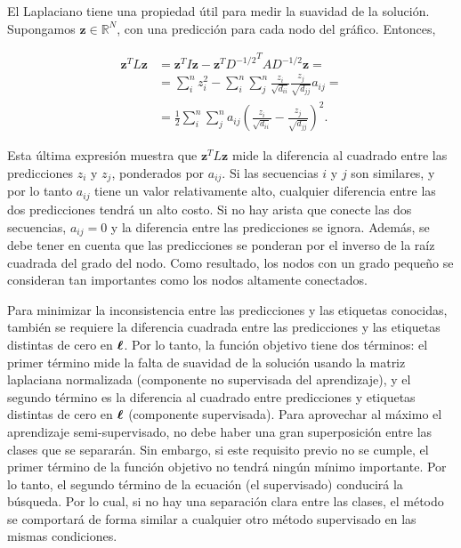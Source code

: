 El Laplaciano tiene una propiedad útil para medir la suavidad de la solución. Supongamos $\mathbf{z} \in \mathbb{R} ^ N$, con una predicción para cada nodo
del gráfico. Entonces,

\begin{equation}
	\begin{split}
		\mathbf{z}^T L \mathbf{z} & = \mathbf{z}^T I \mathbf{z} - \mathbf{z}^T {D^{-1/2}}^T A D^{-1/2} \mathbf{z} = \\
					  & = \sum_{i}^{n} z_{i}^{2} -  \sum_{i}^{n}  \sum_{j}^{n} \frac{z_{i}}{\sqrt{d_{ii}}} \frac{z_{j}}{\sqrt{d_{jj}}}
		a_{ij} = \\
		& = \frac{1}{2} \sum_{i}^{n} \sum_{j}^{n} a_{ij} \left(\frac{z_{i}}{ \sqrt{d_{ii}}} - \frac{z_{j}}{\sqrt{d_{jj}}}
	\right)^{2}.
\end{split}
\end{equation}

\noindent Esta última expresión muestra que $\mathbf {z} ^ T L \mathbf {z}$ mide la diferencia al cuadrado entre las predicciones $z_{i}$ y $z_{j}$,
ponderados por $a_{ij} $. Si las secuencias $ i $ y $ j $ son similares, y por lo tanto $ a_{ij} $ tiene un valor relativamente alto, cualquier diferencia
entre las dos predicciones tendrá un alto costo. Si no hay arista que conecte las dos secuencias, $a_{ij} = 0 $ y la diferencia entre las predicciones se
ignora. Además, se debe tener en cuenta que las predicciones se ponderan por el inverso de la raíz cuadrada del grado del nodo. Como resultado, los nodos con
un grado pequeño se consideran tan importantes como los nodos altamente conectados.

Para minimizar la inconsistencia entre las predicciones y las etiquetas conocidas, también se requiere la diferencia cuadrada entre las predicciones y las
etiquetas distintas de cero en $\boldsymbol\ell $. Por lo tanto, la función objetivo tiene dos términos: el primer término mide la falta de suavidad de la solución
usando la matriz laplaciana normalizada (componente no supervisada del aprendizaje), y el segundo término es la diferencia al cuadrado entre predicciones y
etiquetas distintas de cero en $\boldsymbol\ell$ (componente supervisada). Para aprovechar al máximo el aprendizaje semi-supervisado, no debe haber una gran
superposición entre las clases que se separarán. Sin embargo, si este requisito previo no se cumple, el primer término de la función objetivo no tendrá
ningún mínimo importante. Por lo tanto, el segundo término de la ecuación (el supervisado) conducirá la búsqueda. Por lo cual, si no hay una separación
clara entre las clases, el método se comportará de forma similar a cualquier otro método supervisado en las mismas condiciones.

